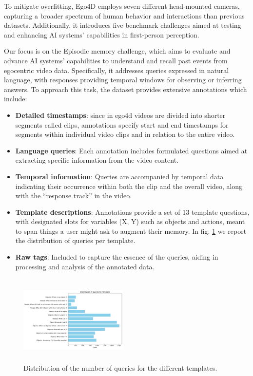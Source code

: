 \documentclass[10pt,twocolumn,letterpaper]{article}
\begin{document}
To mitigate overfitting, Ego4D employs seven different head-mounted cameras, capturing a broader spectrum of human behavior and interactions than previous datasets. Additionally, it introduces five benchmark challenges aimed at testing and enhancing AI systems' capabilities in first-person perception. 

Our focus is on the Episodic memory challenge, which aims to evaluate and advance AI systems’ capabilities to understand and recall past events from egocentric video data. Specifically, it addresses queries expressed in natural language, with responses providing temporal windows for observing or inferring answers. To approach this task, the dataset provides extensive annotations which include:
\begin{itemize}
\setlength{\parskip}{0.05cm}   

    \item \textbf{Detailed timestamps}: since in ego4d videos are divided into shorter segments called clips, annotations specify start and end timestamps for segments within individual video clips and in relation to the entire video.
    \item \textbf{Language queries}: Each annotation includes formulated questions aimed at extracting specific information from the video content.
    \item \textbf{Temporal information}: Queries are accompanied by temporal data indicating their occurrence within both the clip and the overall video, along with the “response track” in the video.
    \item \textbf{Template descriptions}: Annotations provide a set of 13 template questions, with designated slots for variables (X, Y) such as objects and actions, meant to span things a user might ask to augment their memory. In fig. \ref{fig:figure1} we report the distribution of queries per template.
    \item \textbf{Raw tags}: Included to capture the essence of the queries, aiding in processing and analysis of the annotated data.

\end{itemize}

\begin{figure}[h]
\centering
\includegraphics[height=4.5cm,width=0.48\textwidth]{Figure1.pdf} %
\caption{Distribution of the number of queries for the different templates.}
\label{fig:figure1}
\end{figure}
\end{document}
